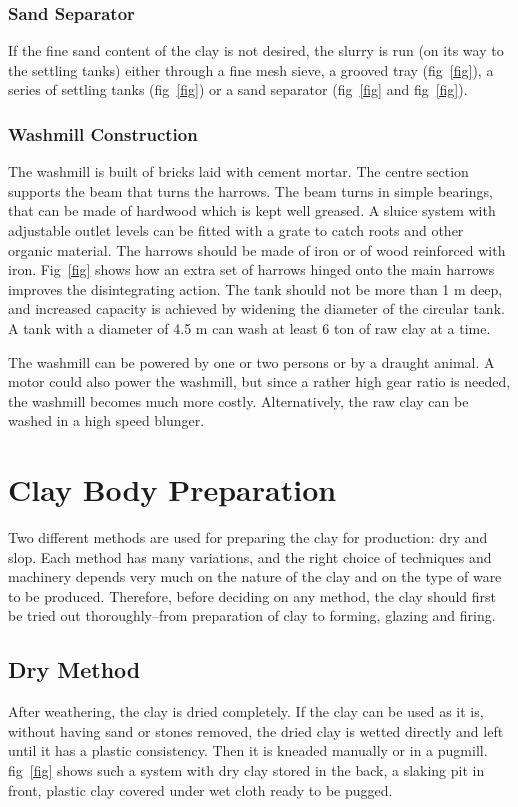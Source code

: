 \subsubsection{Sand Separator}
If the fine sand content of the clay is not desired, the slurry is run (on its 
way to the settling tanks) either through a fine mesh sieve, a grooved tray 
(fig~\ref{fig}), a series of settling tanks (fig~\ref{fig}) or a sand separator 
(fig~\ref{fig} and fig~\ref{fig}).
\subsubsection{Washmill Construction}
The washmill is built of bricks laid with cement mortar. The centre section 
supports the beam that turns the harrows. The beam turns in simple bearings, 
that can be made of hardwood which is kept well greased. A sluice system with 
adjustable outlet levels can be fitted with a grate to catch roots and other 
organic material. The harrows should be made of iron or of wood reinforced with 
iron. Fig~\ref{fig} shows how an extra set of harrows hinged onto the main 
harrows 
improves the disintegrating action. The tank should not be more than 1 m deep, 
and increased capacity is achieved by widening the diameter of the circular 
tank. A tank with a diameter of 4.5 m can wash at least 6 ton of raw clay at a 
time.

The washmill can be powered by one or two persons or by a draught animal. A 
motor could also power the washmill, but since a rather high gear ratio is 
needed, the washmill becomes much more costly. Alternatively, the raw clay can 
be washed in a high speed blunger.
\section{Clay Body Preparation}
Two different methods are used for preparing the clay for production: dry and 
slop. Each method has many variations, and the right choice of techniques and 
machinery depends very much on the nature of the clay and on the type of ware 
to be produced. Therefore, before deciding on any method, the clay should first 
be tried out thoroughly--from preparation of clay to forming, glazing and 
firing.
\subsection{Dry Method}
After weathering, the clay is dried completely. If the clay can be used as it 
is, without having sand or stones removed, the dried clay is wetted directly 
and left until it has a plastic consistency. Then it is kneaded manually or in 
a pugmill. fig~\ref{fig} shows such a system with dry clay stored in the back, 
a 
slaking pit in front, plastic clay covered under wet cloth ready to be pugged.

